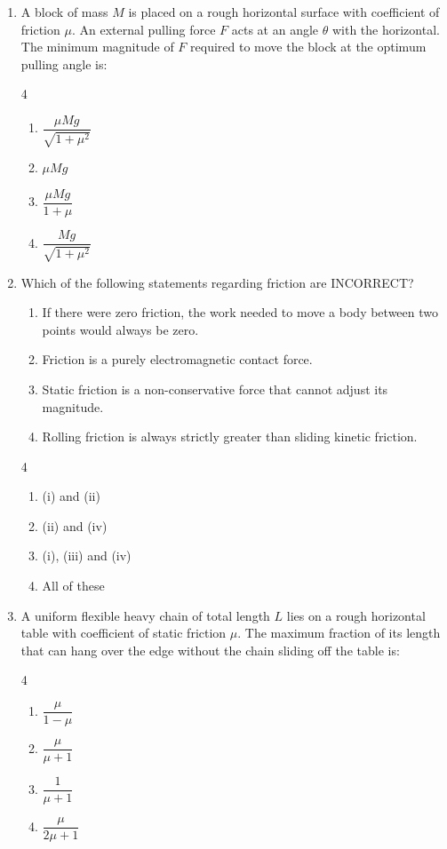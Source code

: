 \documentclass[11pt,a4paper]{article}
\begin{document}
\begin{enumerate}[label=\textbf{\arabic*.},leftmargin=18pt,itemsep=8pt,resume]
  \item A block of mass $M$ is placed on a rough horizontal surface with coefficient of friction $\mu$. An external pulling force $F$ acts at an angle $\theta$ with the horizontal. The minimum magnitude of $F$ required to move the block at the optimum pulling angle is:
  \begin{multicols}{4}
    \begin{enumerate}[label=(\Alph*)]
      \item $\dfrac{\mu Mg}{\sqrt{1 + \mu^2}}$
      \item $\mu Mg$
      \item $\dfrac{\mu Mg}{1 + \mu}$
      \item $\dfrac{Mg}{\sqrt{1 + \mu^2}}$
    \end{enumerate}
  \end{multicols}

  \item Which of the following statements regarding friction are INCORRECT?
  \begin{enumerate}[label=(\roman*),leftmargin=14pt,itemsep=1pt]
    \item If there were zero friction, the work needed to move a body between two points would always be zero.
    \item Friction is a purely electromagnetic contact force.
    \item Static friction is a non-conservative force that cannot adjust its magnitude.
    \item Rolling friction is always strictly greater than sliding kinetic friction.
  \end{enumerate}
  \begin{multicols}{4}
    \begin{enumerate}[label=(\Alph*)]
      \item (i) and (ii)
      \item (ii) and (iv)
      \item (i), (iii) and (iv)
      \item All of these
    \end{enumerate}
  \end{multicols}

  \item A uniform flexible heavy chain of total length $L$ lies on a rough horizontal table with coefficient of static friction $\mu$. The maximum fraction of its length that can hang over the edge without the chain sliding off the table is:
  \begin{multicols}{4}
    \begin{enumerate}[label=(\Alph*)]
      \item $\dfrac{\mu}{1 - \mu}$
      \item $\dfrac{\mu}{\mu + 1}$
      \item $\dfrac{1}{\mu + 1}$
      \item $\dfrac{\mu}{2\mu + 1}$
    \end{enumerate}
  \end{multicols}


\end{enumerate}
\end{document}
